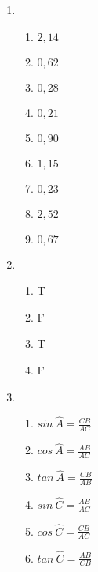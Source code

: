 {\begin{multicols}{3}
\begin{enumerate}[noitemsep, label=\textbf{\arabic*}. ]
\item %
\begin{enumerate}[noitemsep, label=\textbf{(\alph*)} ]
\item $2,14$%
\item $0,62$%
\item $0,28$%
\item $0,21$%
\item $0,90$%
\item $1,15$%
\item $0,23$%
\item $2,52$%
\item $0,67$%

\end{enumerate}

\item %
\begin{enumerate}[noitemsep, label=\textbf{(\alph*)} ]
\item T%
\item F%
\item T%
\item F%
\end{enumerate}


\item %



\begin{enumerate}[itemsep=1pt, label=\textbf{(\alph*)} ]
\item $sin~\hat{A} = \frac{CB}{AC}$%
\item $cos~\hat{A} = \frac{AB}{AC}$%
\item $tan~\hat{A} = \frac{CB}{AB}$%
\item $sin~\hat{C} = \frac{AB}{AC}$%
\item $cos~\hat{C} = \frac{CB}{AC}$%
\item $tan~\hat{C} = \frac{AB}{CB}$%
\end{enumerate}


\end{enumerate}
\end{multicols}}
